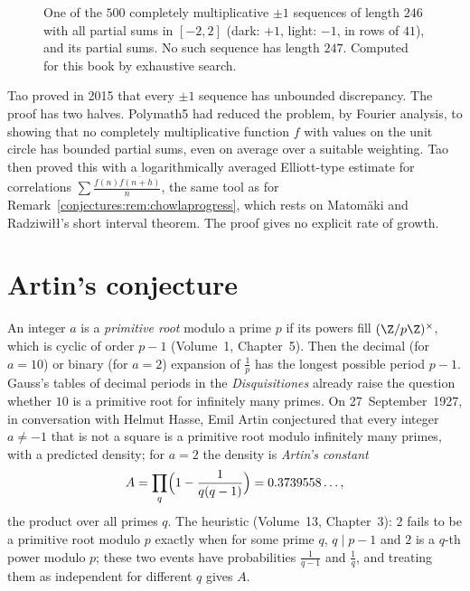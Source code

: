 \begin{figure}[ht]
\centering
{}
\caption{One of the $500$ completely multiplicative $\pm1$ sequences of length $246$ with all partial sums in $[-2,2]$ (dark: $+1$, light: $-1$, in rows of
$41$), and its partial sums. No such sequence has length $247$. Computed for this book by exhaustive search.}
\label{conjectures:fig:mult}
\end{figure}

\begin{remark}\label{conjectures:rem:taoedp}
Tao proved in 2015 that every $\pm1$ sequence has unbounded discrepancy. The proof has two halves. Polymath5 had reduced the problem, by Fourier analysis, to
showing that no completely multiplicative function $f$ with values on the unit circle has bounded partial sums, even on average over a suitable weighting.
Tao then proved this with a logarithmically averaged Elliott-type estimate for correlations $\sum\frac{f(n)\overline{f(n+h)}}n$, the same tool as for
Remark~\ref{conjectures:rem:chowlaprogress}, which rests on Matom\"aki and Radziwi\l\l's short interval theorem. The proof gives no explicit rate of growth.
\end{remark}

\section{Artin's conjecture}

An integer $a$ is a \emph{primitive root} modulo a prime $p$ if its powers fill $(\Z/p\Z)^\times$, which is cyclic of order $p-1$ (Volume~1, Chapter~5). Then the
decimal (for $a=10$) or binary (for $a=2$) expansion of $\frac1p$ has the longest possible period $p-1$. Gauss's tables of decimal periods in the
\emph{Disquisitiones} already raise the question whether $10$ is a primitive root for infinitely many primes. On 27~September~1927, in conversation with Helmut Hasse, Emil Artin conjectured that every integer $a\ne-1$ that is
not a square is a primitive root modulo infinitely many primes, with a predicted density; for $a=2$ the density is \emph{Artin's constant}
\[
A=\prod_q\Bigl(1-\frac1{q(q-1)}\Bigr)=0.3739558\ldots,
\]
the product over all primes $q$. The heuristic (Volume~13, Chapter~3): $2$ fails to be a primitive root modulo $p$ exactly when for some prime $q$, $q\mid p-1$ and $2$
is a $q$-th power modulo $p$; these two events have probabilities $\frac1{q-1}$ and $\frac1q$, and treating them as independent for different $q$ gives $A$.

